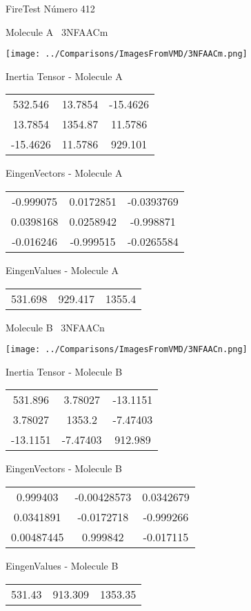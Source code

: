 \vtab[-3cm]
\begin{center}
{\large FireTest \tab Número 412}
\end{center}
\begin{multicols}{2}
\begin{center}

Molecule A \
3NFAACm

\texttt{[image: ../Comparisons/ImagesFromVMD/3NFAACm.png]}

Inertia Tensor - Molecule A \\
\begin{tabular}{|c c c|}
532.546	 & 	13.7854	 & 	-15.4626	 \\
13.7854	 & 	1354.87	 & 	11.5786	 \\
-15.4626	 & 	11.5786	 & 	929.101
\end{tabular}

\vtab
 EingenVectors - Molecule A     \\
\begin{tabular}{|c c c|}
-0.999075	 & 	0.0172851	 & 	-0.0393769	 \\
0.0398168	 & 	0.0258942	 & 	-0.998871	 \\
-0.016246	 & 	-0.999515	 & 	-0.0265584
\end{tabular}

\vtab
 EingenValues - Molecule A     \\
\begin{tabular}{|c c c|}
531.698	 & 	929.417	 & 	1355.4	 \\
\end{tabular}
\columnbreak

Molecule B \
3NFAACn

\texttt{[image: ../Comparisons/ImagesFromVMD/3NFAACn.png]}

Inertia Tensor - Molecule B \\
\begin{tabular}{|c c c|}
531.896	 & 	3.78027	 & 	-13.1151	 \\
3.78027	 & 	1353.2	 & 	-7.47403	 \\
-13.1151	 & 	-7.47403	 & 	912.989
\end{tabular}

\vtab
 EingenVectors - Molecule B     \\
\begin{tabular}{|c c c|}
0.999403	 & 	-0.00428573	 & 	0.0342679	 \\
0.0341891	 & 	-0.0172718	 & 	-0.999266	 \\
0.00487445	 & 	0.999842	 & 	-0.017115
\end{tabular}

\vtab
 EingenValues - Molecule B     \\
\begin{tabular}{|c c c|}
531.43	 & 	913.309	 & 	1353.35	 \\
\end{tabular}

\end{center}
\end{multicols}


